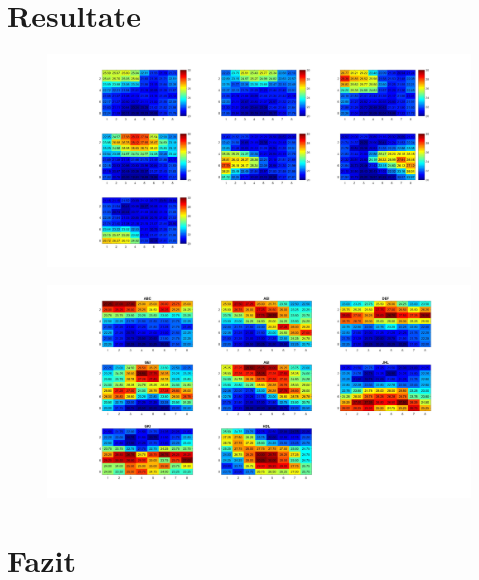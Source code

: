\section{Resultate}

\begin{figure}
	\centering
	\includegraphics[width=1.0\linewidth]{fig/p1_g_Allpositions_mean}
	\caption{}
	\label{fig:p1gallpositionsmean}
\end{figure}





\begin{figure}
	\centering
	\includegraphics[width=1.0\linewidth]{fig/p3_3x3_allpositons}
	\caption{}
	\label{fig:p33x3allpositons}
\end{figure}





\section{Fazit}